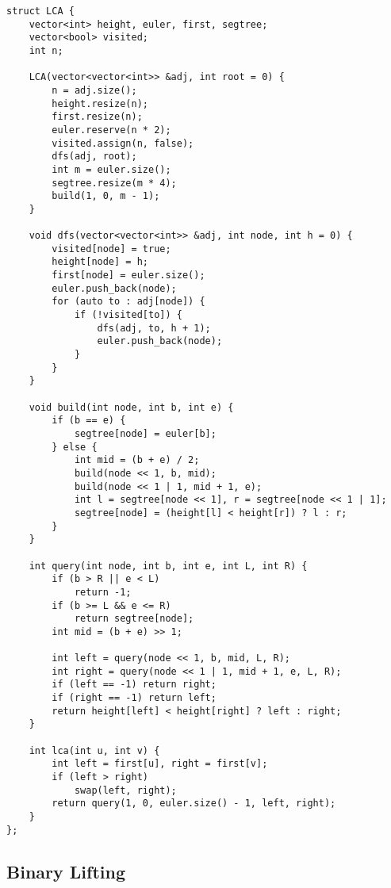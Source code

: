 \documentclass{article}
\begin{document}
\begin{lstlisting}
struct LCA {
    vector<int> height, euler, first, segtree;
    vector<bool> visited;
    int n;

    LCA(vector<vector<int>> &adj, int root = 0) {
        n = adj.size();
        height.resize(n);
        first.resize(n);
        euler.reserve(n * 2);
        visited.assign(n, false);
        dfs(adj, root);
        int m = euler.size();
        segtree.resize(m * 4);
        build(1, 0, m - 1);
    }

    void dfs(vector<vector<int>> &adj, int node, int h = 0) {
        visited[node] = true;
        height[node] = h;
        first[node] = euler.size();
        euler.push_back(node);
        for (auto to : adj[node]) {
            if (!visited[to]) {
                dfs(adj, to, h + 1);
                euler.push_back(node);
            }
        }
    }

    void build(int node, int b, int e) {
        if (b == e) {
            segtree[node] = euler[b];
        } else {
            int mid = (b + e) / 2;
            build(node << 1, b, mid);
            build(node << 1 | 1, mid + 1, e);
            int l = segtree[node << 1], r = segtree[node << 1 | 1];
            segtree[node] = (height[l] < height[r]) ? l : r;
        }
    }

    int query(int node, int b, int e, int L, int R) {
        if (b > R || e < L)
            return -1;
        if (b >= L && e <= R)
            return segtree[node];
        int mid = (b + e) >> 1;

        int left = query(node << 1, b, mid, L, R);
        int right = query(node << 1 | 1, mid + 1, e, L, R);
        if (left == -1) return right;
        if (right == -1) return left;
        return height[left] < height[right] ? left : right;
    }

    int lca(int u, int v) {
        int left = first[u], right = first[v];
        if (left > right)
            swap(left, right);
        return query(1, 0, euler.size() - 1, left, right);
    }
};

\end{lstlisting}

\subsection{Binary Lifting}
\end{document}
